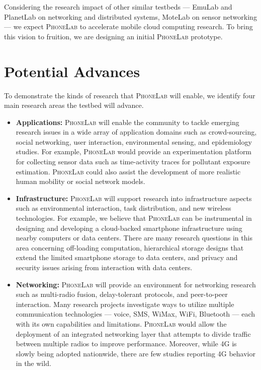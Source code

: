 Considering the research impact of other similar testbeds --- EmuLab and
PlanetLab on networking and distributed systems, MoteLab on sensor networking
--- we expect {\scshape PhoneLab} to accelerate mobile cloud computing
research. To bring this vision to fruition, we are designing an initial
{\scshape PhoneLab} prototype.

\section{Potential Advances} To demonstrate the kinds of research that
{\scshape PhoneLab} will enable, we identify four main research areas the
testbed will advance. 

\begin{itemize}

\item \textbf{Applications:} {\scshape PhoneLab} will enable the community to
tackle emerging research issues in a wide array of application domains such
as crowd-sourcing, social networking, user interaction, environmental
sensing, and epidemiology studies. For example, {\scshape PhoneLab} would
provide an experimentation platform for collecting sensor data such as
time-activity traces for pollutant exposure estimation. {\scshape PhoneLab}
could also assist the development of more realistic human mobility or social
network models.

\item \textbf{Infrastructure:} {\scshape PhoneLab} will support research into
infrastructure aspects such as environmental interaction, task distribution,
and new wireless technologies. For example, we believe that {\scshape
PhoneLab} can be instrumental in designing and developing a cloud-backed
smartphone infrastructure using nearby computers or data centers. There are
many research questions in this area concerning off-loading computation,
hierarchical storage designs that extend the limited smartphone storage to
data centers, and privacy and security issues arising from interaction with
data centers.

\item \textbf{Networking:} {\scshape PhoneLab} will provide an 
environment for networking research such as multi-radio fusion,
delay-tolerant protocols, and peer-to-peer interaction. Many research
projects investigate ways to utilize multiple communication technologies ---
voice, SMS, WiMax, WiFi, Bluetooth --- each with its own capabilities and
limitations. {\scshape PhoneLab} would allow the deployment of an integrated
networking layer that attempts to divide traffic between multiple radios to
improve performance. Moreover, while 4G is slowly being adopted nationwide,
there are few studies reporting 4G behavior in the wild.


\end{itemize}
